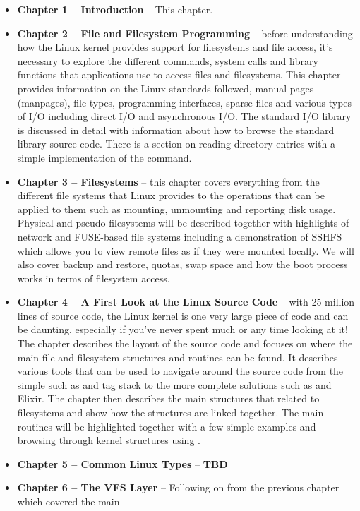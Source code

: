 \begin{itemize}
	\item{\textbf{Chapter 1 -- Introduction}} -- This chapter.
	\item{\textbf{Chapter 2 -- File and Filesystem Programming}} -- before understanding how the Linux kernel provides support
		for filesystems and file access, it's necessary to explore the different commands, system calls and 
		library functions that applications use to access files and filesystems. This chapter provides information
		on the Linux standards followed, manual pages (manpages), file types, programming interfaces, 
		sparse files and various types of I/O including direct I/O and asynchronous I/O. The standard I/O
		library is discussed in detail with information about how to browse the standard library source code.
		There is a section on reading directory entries with a simple implementation of the  command.
	\item{\textbf{Chapter 3 -- Filesystems}} -- this chapter covers everything from the different file systems that 
		Linux provides to the operations that can be applied to them such as mounting, unmounting and reporting 
		disk usage. Physical and pseudo filesystems will be described together with highlights of network 
		and FUSE-based file systems including a demonstration of SSHFS which allows you to view remote 
		files as if they were mounted locally. We will also cover backup and restore, quotas, swap space and 
		how the boot process works in terms of filesystem access.
	\item{\textbf{Chapter 4 -- A First Look at the Linux Source Code}} -- with 25 million lines of source code, the 
		Linux kernel is one very large piece of code and can be daunting, especially if you've never spent much 
		or any time looking at it! The chapter describes the layout of the source code and focuses on where the
		main file and filesystem structures and routines can be found. It describes various tools that can
		be used to navigate around the source code from the simple such as  and tag stack to 
		the more complete solutions such as  and Elixir. The chapter then describes the
		main structures that related to filesystems and show how the structures are linked together. The
		main routines will be highlighted together with a few simple examples and browsing through
		kernel structures using .
	\item \textbf{Chapter 5 -- Common Linux Types} -- \textbf{TBD}
	\item \textbf{Chapter 6 -- The VFS Layer} -- Following on from the previous chapter which covered the main 

\end{itemize}
